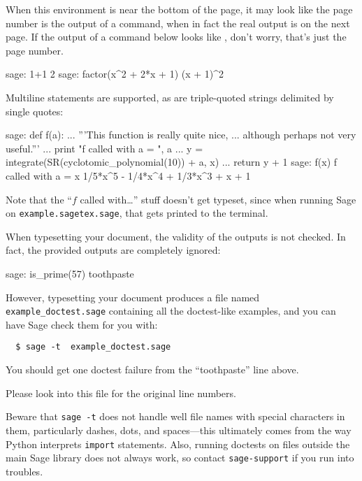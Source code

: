 \documentclass{article}
\begin{document}
When this environment is near the bottom of the page, it may look like
the page number is the output of a command, when in fact the real output
is on the next page. If the output of a command below looks like
\thepage, don't worry, that's just the page number.

\begin{sageexample}
  sage: 1+1
  2
  sage: factor(x^2 + 2*x + 1)
  (x + 1)^2
\end{sageexample}
Multiline statements are supported, as are triple-quoted strings
delimited by single quotes:
\renewcommand{\sageexampleincludetextoutput}{False}
\begin{sageexample}
  sage: def f(a):
  ...       '''This function is really quite nice,
  ...       although perhaps not very useful.'''
  ...       print "f called with a = ", a
  ...       y = integrate(SR(cyclotomic_polynomial(10)) + a, x)
  ...       return y + 1
  sage: f(x)
  f called with a =  x
  1/5*x^5 - 1/4*x^4 + 1/3*x^3 + x + 1
\end{sageexample}
Note that the ``$f$ called with\ldots'' stuff doesn't get typeset, since
when running Sage on \texttt{example.sagetex.sage}, that gets printed to the
terminal.

When typesetting your document, the validity of the outputs is not
checked. In fact, the provided outputs are completely ignored:
\renewcommand{\sageexampleincludetextoutput}{True}
\begin{sageexample}
  sage: is_prime(57)
  toothpaste
\end{sageexample}
\renewcommand{\sageexampleincludetextoutput}{False}

However, typesetting your document produces a file named
\texttt{example\_doctest.sage} containing all the doctest-like examples,
and you can have Sage check them for you with:
\begin{verbatim}
  $ sage -t  example_doctest.sage
\end{verbatim}
You should get one doctest failure from the ``toothpaste'' line above.

Please look into this file for the original line numbers.

Beware that \texttt{sage -t} does not handle well file names with
special characters in them, particularly dashes, dots, and spaces---this
ultimately comes from the way Python interprets \texttt{import}
statements. Also, running doctests on files outside the main Sage
library does not always work, so contact \texttt{sage-support} if you
run into troubles.
\end{document}
